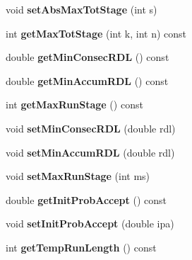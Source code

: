 \begin{DoxyCompactItemize}
\item 
\hypertarget{class_k_mterm_a43f4798cb5e73dc85b81ead95eafcd2e}{
void {\bfseries setAbsMaxTotStage} (int s)}
\label{class_k_mterm_a43f4798cb5e73dc85b81ead95eafcd2e}

\item 
\hypertarget{class_k_mterm_a66a170ccf8256ae8f2233a6a3e1dedbc}{
int {\bfseries getMaxTotStage} (int k, int n) const }
\label{class_k_mterm_a66a170ccf8256ae8f2233a6a3e1dedbc}

\item 
\hypertarget{class_k_mterm_a3bb373a030606d62b4fc45227a2d5c25}{
double {\bfseries getMinConsecRDL} () const }
\label{class_k_mterm_a3bb373a030606d62b4fc45227a2d5c25}

\item 
\hypertarget{class_k_mterm_a2bf50c9c0879819a10442d2c3f98cb6f}{
double {\bfseries getMinAccumRDL} () const }
\label{class_k_mterm_a2bf50c9c0879819a10442d2c3f98cb6f}

\item 
\hypertarget{class_k_mterm_ac13232869276bdc1554e2f1e61c95343}{
int {\bfseries getMaxRunStage} () const }
\label{class_k_mterm_ac13232869276bdc1554e2f1e61c95343}

\item 
\hypertarget{class_k_mterm_abeef9b87b15dc3d4d56ab47913d4b81b}{
void {\bfseries setMinConsecRDL} (double rdl)}
\label{class_k_mterm_abeef9b87b15dc3d4d56ab47913d4b81b}

\item 
\hypertarget{class_k_mterm_a9401f5aa3fe9b384fb5fc0d45fe0e06a}{
void {\bfseries setMinAccumRDL} (double rdl)}
\label{class_k_mterm_a9401f5aa3fe9b384fb5fc0d45fe0e06a}

\item 
\hypertarget{class_k_mterm_a6ff57f58b1e7227d32182a998ec735da}{
void {\bfseries setMaxRunStage} (int ms)}
\label{class_k_mterm_a6ff57f58b1e7227d32182a998ec735da}

\item 
\hypertarget{class_k_mterm_a7153bc033271d8a1864a79a66cf6f222}{
double {\bfseries getInitProbAccept} () const }
\label{class_k_mterm_a7153bc033271d8a1864a79a66cf6f222}

\item 
\hypertarget{class_k_mterm_acfd5067d49d00e7d1dab7562b37e9ad8}{
void {\bfseries setInitProbAccept} (double ipa)}
\label{class_k_mterm_acfd5067d49d00e7d1dab7562b37e9ad8}

\item 
\hypertarget{class_k_mterm_a0a1ee7f49e6d91e1059e873a3e6641c9}{
int {\bfseries getTempRunLength} () const }
\label{class_k_mterm_a0a1ee7f49e6d91e1059e873a3e6641c9}


\end{DoxyCompactItemize}

